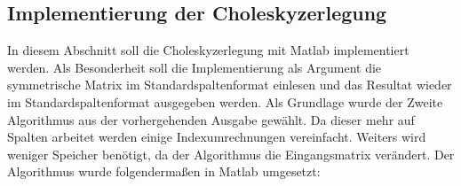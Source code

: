 \subsection{Implementierung der Choleskyzerlegung}\label{Aufgabe_c}
In diesem Abschnitt soll die Choleskyzerlegung mit Matlab implementiert werden. 
Als Besonderheit soll die Implementierung als Argument die symmetrische Matrix
im Standardspaltenformat einlesen und das Resultat wieder im Standardspaltenformat
ausgegeben werden. Als Grundlage wurde der Zweite Algorithmus aus der vorhergehenden
Ausgabe gewählt. Da dieser mehr auf Spalten arbeitet werden einige Indexumrechnungen
vereinfacht. Weiters wird weniger Speicher benötigt, da der Algorithmus die 
Eingangsmatrix verändert. Der Algorithmus wurde folgendermaßen in Matlab umgesetzt:

